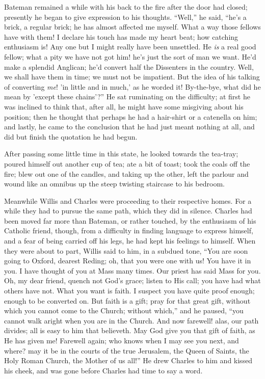 Bateman remained a while with his back to the fire after the door
had closed; presently he began to give expression to his thoughts.
``Well,'' he said, ``he's a brick, a regular brick; he has
almost affected me myself. What a way those fellows have with them! I
declare his touch has made my heart beat; how catching enthusiasm is!
Any one but I might really have been unsettled. He \emph{is} a real
good fellow; what a pity we have not got him! he's just the sort of
man we want. He'd make a splendid Anglican; he'd convert half the
Dissenters in the country. Well, we shall have them in time; we must
not be impatient. But the idea of his talking of converting \emph{me}!
'in little and in much,' as he worded it! By-the-bye, what did he mean
by 'except these chains'?'' He sat ruminating on the difficulty;
at first he was inclined to think that, after all, he might have some
misgiving about his position; then he thought that perhaps he had a
hair-shirt or a catenella on him; and lastly, he came to the
conclusion that he had just meant nothing at all, and did but finish
the quotation he had begun.

After passing some little time in this state, he looked towards the
tea-tray; poured himself out another cup of tea; ate a bit of toast;
took the coals off the fire; blew out one of the candles, and taking
up the other, left the parlour and wound like an omnibus up the steep
twisting staircase to his bedroom.

Meanwhile Willis and Charles were proceeding to their respective
homes. For a while they had to pursue the same path, which they did in
silence. Charles had been moved far more than Bateman, or rather
touched, by the enthusiasm of his Catholic friend, though, from a
difficulty in finding language to express himself, and a fear of being
carried off his legs, he had kept his feelings to himself. When they
were about to part, Willis said to him, in a subdued tone, ``You
are soon going to Oxford, dearest Reding; oh, that you were one with
us! You have it in you. I have thought of you at Mass many times. Our
priest has said Mass for you. Oh, my dear friend, quench not God's
grace; listen to His call; you have had what others have not. What you
want is faith. I suspect you have quite proof enough; enough to be
converted on. But faith is a gift; pray for that great gift, without
which you cannot come to the Church; without which,'' and he
paused, ``you cannot walk aright when you are in the Church. And
now farewell! alas, our path divides; all is easy to him that
believeth. May God give you that gift of faith, as He has given me!
Farewell again; who knows when I may see you next, and where? may it
be in the courts of the true Jerusalem, the Queen of Saints, the Holy
Roman Church, the Mother of us all!'' He drew Charles to him
and kissed his cheek, and was gone before Charles had time to say a
word.


